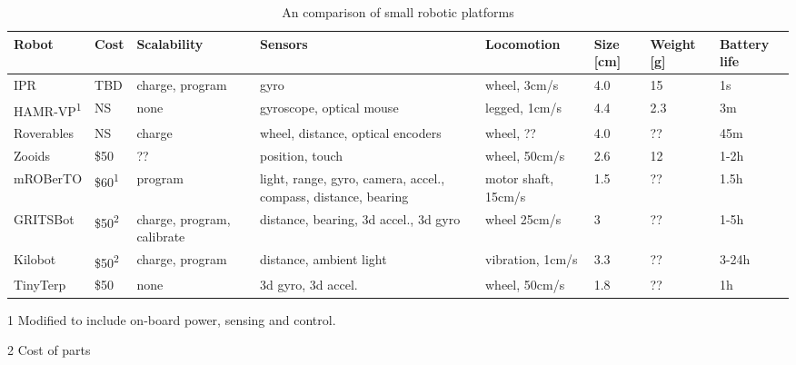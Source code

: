 \documentclass[letterpaper, 10 pt, conference]{ieeeconf}  %
\begin{document}



\begin{table*}[t]
	\centering
	\begin{threeparttable}
		\caption{An comparison of small robotic platforms}
		\label{tab:1}
 		\begin{tabularx}{500pt}{l l X X l l l l} 
			\hline
 			Robot & Cost & Scalability & Sensors & Locomotion & Size [cm] & Weight [g] & Battery life \\ 
 			\hline
 			IPR & TBD & charge, program & gyro & wheel, 3cm/s & 4.0 & 15 & 1s\\
 			HAMR-VP\textsuperscript{1} \cite{bruhwiler_iros_2015} & NS & none & gyroscope, optical mouse & legged, 1cm/s & 4.4 & 2.3 & 3m \\
 			Roverables \cite{dementyev_uist_2016} & NS & charge & wheel, distance, optical encoders & wheel, ?? & 4.0 & ?? & 45m \\ 
 			Zooids \cite{legoc_uist_2016} & \$50 & ?? & position, touch & wheel, 50cm/s & 2.6 & 12 & 1-2h \\ 
 			mROBerTO \cite{kim_iros_2016} & \$60\textsuperscript{1} & program & light, range, gyro, camera, accel., compass, distance, bearing & motor shaft, 15cm/s & 1.5 & ?? & 1.5h\\
 			GRITSBot \cite{pickem_icra_2015} & \$50\textsuperscript{2} & charge, program, calibrate & distance, bearing, 3d accel., 3d gyro & wheel 25cm/s & 3 & ?? & 1-5h \\
 			Kilobot \cite{rubenstein_icra_2012} & \$50\textsuperscript{2} & charge, program & distance, ambient light & vibration, 1cm/s & 3.3 & ?? & 3-24h\\
 			TinyTerp \cite{sabelhaus_icra_2013} & \$50 & none & 3d gyro, 3d accel. & wheel, 50cm/s & 1.8 & ?? & 1h\\
			\hline
		\end{tabularx}
		\begin{tablenotes}
			\item [1] Modified to include on-board power, sensing and control.
			\item [2] Cost of parts
		\end{tablenotes}
	\end{threeparttable}
\end{table*}
\end{document}
